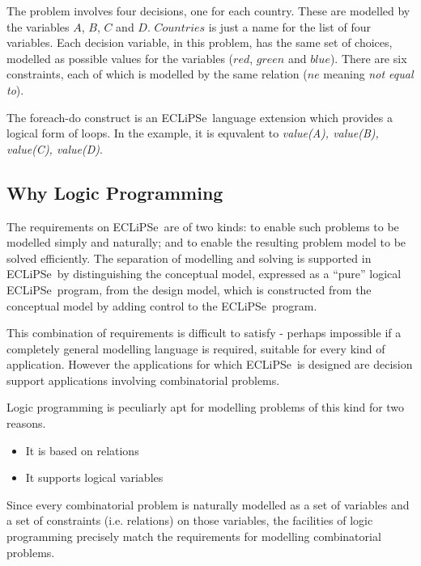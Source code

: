 \documentclass[a4wide]{article}
\newcommand{\ECL}{\mbox{ECLiPSe\ }{\hspace{1mm}}}
\begin{document}
The problem involves four decisions, one for each country.  These are
modelled by the variables $A$, $B$, $C$ and $D$.  $Countries$ is just
a name for the list of four variables.
Each decision variable,
in this problem, has the same set of choices, modelled as possible values
for the variables ($red$, $green$ and $blue$).
There are six constraints, each of which is modelled by the same
relation ($ne$ meaning {\em not equal to}).

The foreach-do construct is an \ECL language extension which provides
a logical form of loops. In the example, it is equvalent to
{\em value(A), value(B), value(C), value(D)}.


\subsection{Why Logic Programming}

The requirements on \ECL are of two kinds: to enable
such problems to be modelled simply and naturally; 
and to enable the resulting problem model to be solved efficiently.
The separation of modelling and solving is supported in \ECL by
distinguishing the conceptual model, expressed as a ``pure'' logical
\ECL program, from the design model, which is constructed from the
conceptual model by adding control to the \ECL program.

This combination of requirements is difficult to satisfy - perhaps
impossible if a completely general modelling language is required,
suitable for every kind of application. 
However the applications for which \ECL is designed are decision
support applications involving combinatorial problems.

Logic programming is peculiarly apt for modelling problems of this
kind for two reasons.
\begin{itemize}
\item
It is based on relations
\item
It supports logical variables
\end{itemize}
Since every combinatorial problem is naturally modelled as a set of
variables and a set of constraints (i.e. relations) on those
variables, the facilities of logic programming precisely match the
requirements for modelling combinatorial problems.
\end{document}
